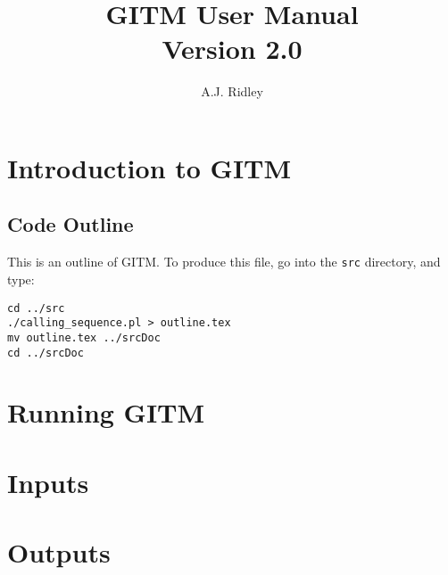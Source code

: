 \documentclass[twoside,10pt]{book}
\title{GITM User Manual \\ \large Version 2.0}
\author{A.J. Ridley}
\begin{document}
\pagestyle{fancy}
\lhead[\fancyplain{}{\bfseries\thepage}]{\fancyplain{}{\bfseries\rightmark}}
\rhead[\fancyplain{}{\bfseries\leftmark}]{\fancyplain{}{\bfseries\thepage}}
\cfoot{}


\maketitle

\tableofcontents

\clearpage

\chapter{Introduction to GITM}


\section{Code Outline}

This is an outline of GITM.  To produce this file, go into the {\tt src} 
directory, and type:
\begin{verbatim}
cd ../src
./calling_sequence.pl > outline.tex
mv outline.tex ../srcDoc
cd ../srcDoc
\end{verbatim}



\chapter{Running GITM}




\chapter{Inputs}





\chapter{Outputs}





\end{document}
